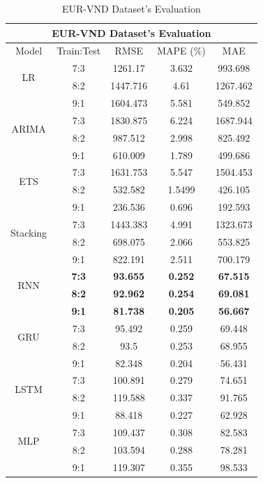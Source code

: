 \documentclass{ieeeojies}
\begin{document}
\begin{table}[H]
    \centering
    \begin{tabular}{|c|c|c|c|c|}
         \hline
         \multicolumn{5}{|c|}{\textbf{EUR-VND Dataset's Evaluation}}\\
         \hline
         \centering Model & Train:Test & RMSE & MAPE (\%) & MAE\\
         \hline
         \multirow{2}{*}{LR} & 7:3 &1261.17 &3.632 &993.698 \\ & 8:2 & 1447.716 & 4.61 & 1267.462 \\& 9:1 & 1604.473 & 5.581 & 549.852 \\
         \hline
         \multirow{2}{*}{ARIMA} & 7:3 & 1830.875 & 6.224 & 1687.944 \\ & 8:2 & 987.512 & 2.998 & 825.492 \\ & 9:1 & 610.009&1.789 & 499.686\\
         \hline
         \multirow{2}{*}{ETS} & 7:3 & 1631.753 & 5.547 & 1504.453 \\ & 8:2 & 532.582&1.5499&426.105 \\& 9:1 & 236.536 & 0.696& 192.593 \\
         \hline
         \multirow{2}{*}{Stacking} & 7:3 & 1443.383 & 4.991 & 1323.673 \\ & 8:2 &698.075&2.066&553.825\\& 9:1 & 822.191 & 2.511 & 700.179 \\
         \hline
         \multirow{2}{*}{RNN} & \textbf{7:3} & \textbf{93.655} & \textbf{0.252} & \textbf{67.515} \\ & \textbf{8:2} & \textbf{92.962} & \textbf{0.254} & \textbf{69.081} \\ & \textbf{9:1} & \textbf{81.738} & \textbf{0.205} &\textbf{56.667} \\
         \hline
         \multirow{2}{*}{GRU} & 7:3 & 95.492 & 0.259 & 69.448 \\ & 8:2 & 93.5& 0.253 & 68.955\\ & 9:1 & 82.348& 0.204 & 56.431 \\
         \hline
         \multirow{2}{*}{LSTM} & 7:3 & 100.891 &0.279& 74.651\\ & 8:2 &119.588 &0.337 &91.765
\\&9:1&88.418& 0.227& 62.928 \\
         \hline
         \multirow{2}{*}{MLP} & 7:3 &109.437& 0.308& 82.583 \\ & 8:2 & 103.594 &0.288 &78.281 \\ & 9:1 & 119.307& 0.355& 98.533\\
         \hline
    \end{tabular}
    \caption{EUR-VND Dataset's Evaluation}
    \label{vcbresult}
\end{table}
\end{document}
